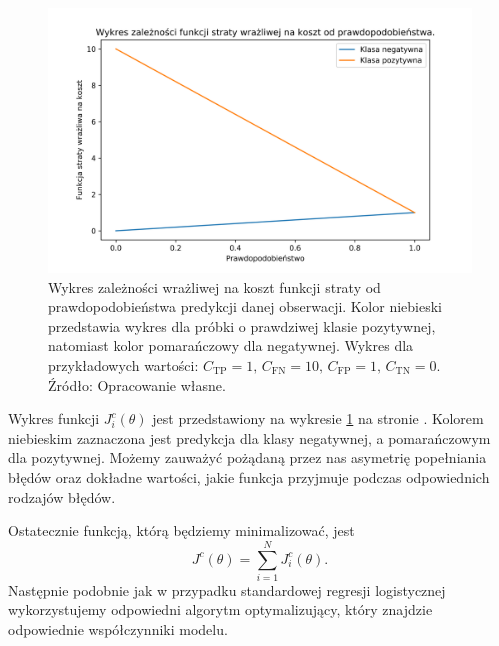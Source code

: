 \documentclass[inzynierska]{pwr_wmat_praca_dyplomowa}
\theoremstyle{plain}
\numberwithin{theorem}{chapter}
\theoremstyle{definition}
\numberwithin{theorem}{chapter}
\begin{document}
\begin{figure}[h]
	\includegraphics[width=\linewidth]{images/cost_sensitive_ce.png}
	\caption{Wykres zależności wrażliwej na koszt funkcji straty od prawdopodobieństwa predykcji danej obserwacji. Kolor niebieski przedstawia wykres dla próbki o prawdziwej klasie pozytywnej, natomiast kolor pomarańczowy dla negatywnej. Wykres dla przykładowych wartości: $C_{\text{TP}} = 1 \text{, } C_{\text{FN}} = 10 \text{, } C_{\text{FP}} = 1 \text{, } C_{\text{TN}} = 0$. Źródło: Opracowanie własne.}
	\label{fig:cost-sensitive-loss-function}
\end{figure}

Wykres funkcji $J^c_i(\theta)$ jest przedstawiony na wykresie \ref{fig:cost-sensitive-loss-function} na stronie \pageref{fig:cost-sensitive-loss-function}. Kolorem niebieskim zaznaczona jest predykcja dla klasy negatywnej, a pomarańczowym dla pozytywnej. Możemy zauważyć pożądaną przez nas asymetrię popełniania błędów oraz dokładne wartości, jakie funkcja przyjmuje podczas odpowiednich rodzajów błędów.

Ostatecznie funkcją, którą będziemy minimalizować, jest 
$$ J^c(\theta) = \sum_{i=1}^{N} J^c_i(\theta) \text{.} $$
Następnie podobnie jak w przypadku standardowej regresji logistycznej wykorzystujemy odpowiedni algorytm optymalizujący, który znajdzie odpowiednie współczynniki modelu.
\end{document}
